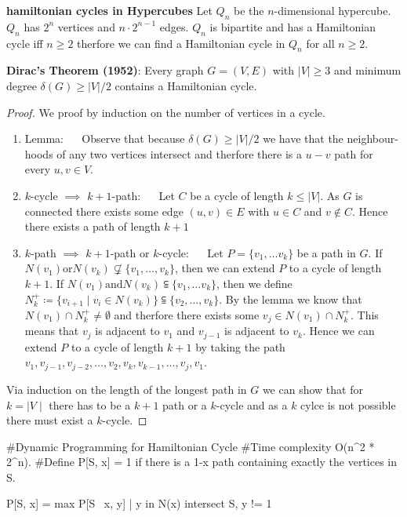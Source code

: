 \begin{example}
    \textbf{hamiltonian cycles in Hypercubes} Let $Q_n$ be the $n$-dimensional hypercube. $Q_n$ has $2^n$ vertices and $n \cdot 2^{n-1}$ edges.
    $Q_n$ is bipartite and has a Hamiltonian cycle iff $n \ge 2$ therfore we can find a Hamiltonian cycle in $Q_n$ for all $n \ge 2$.
\end{example}

\begin{theorem}
    \textbf{Dirac's Theorem (1952)}: Every graph $G = (V, E)$ with $|V| \ge 3$ and minimum degree $\delta(G) \ge |V|/2$ contains a Hamiltonian cycle.
\end{theorem}

\begin{proof}
    We proof by induction on the number of vertices in a cycle.
    \begin{enumerate}
        \item Lemma: $\quad$ Observe that because $\delta(G) \ge |V|/2$ we have that the neighbour-hoods of any two vertices intersect and therfore there is a $u-v$ path for every $u,v \in V$.
        \item $k$-cycle $\implies$ $k+1$-path: $\quad$ Let $C$ be a cycle of length $k \le |V|$. As $G$ is connected there exists some edge $(u,v) \in E$ with $u \in C$ and $v \notin C$. Hence there exists a path of length $k+1$
        \item $k$-path $\implies$ $k+1$-path or $k$-cycle: $\quad$ Let $P = \{v_1, \dots v_k\}$ be a path in $G$. If $N(v_1) \text{or} N(v_k) \not \subsetneq \{v_1, \dots, v_k\}$, then we can extend $P$ to a cycle of length $k+1$. If $N(v_1) \text{and} N(v_k) \subseteqq \{v_1, \dots v_k\}$, then we define $N_k^+ \coloneqq \{v_{i+1} \mid v_i \in N(v_k)\} \subseteqq \{v_2, \dots, v_k\}$. By the lemma we know that $N(v_1) \cap N_k^+ \neq \emptyset$ and therfore there exists some $v_j \in N(v_1) \cap N_k^+$. This means that $v_j$ is adjacent to $v_1$ and $v_{j-1}$ is adjacent to $v_k$. Hence we can extend $P$ to a cycle of length $k+1$ by taking the path $v_1, v_{j-1}, v_{j-2}, \dots, v_2, v_k, v_{k-1}, \dots, v_j, v_1$.
    \end{enumerate}
    Via induction on the length of the longest path in $G$ we can show that for $k=\mid V \mid$ there has to be a $k+1$ path or a $k$-cycle and as a $k$ cylce is not possible there must exist a $k$-cycle.
\end{proof}

\begin{algorithm}
#Dynamic Programming for Hamiltonian Cycle
#Time complexity O(n^2 * 2^n).
#Define P[S, x] = 1 if there is a 1-x path containing exactly the vertices in S.

P[S, x] = max { P[S \ {x}, y] | y in N(x) intersect S, y != 1 }
\end{algorithm}

